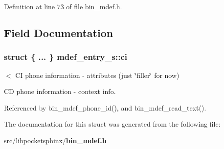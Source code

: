 Definition at line 73 of file bin\-\_\-mdef.\-h.



\subsection{Field Documentation}
\subsubsection[{ci}]{\setlength{\rightskip}{0pt plus 5cm}struct \{ ... \}   mdef\-\_\-entry\-\_\-s\-::ci}\label{structmdef__entry__s_a24e5db7af5e705b310e82154055043ec}


$<$ C\-I phone information -\/ attributes (just \char`\"{}filler\char`\"{} for now) 

C\-D phone information -\/ context info. 

Referenced by bin\-\_\-mdef\-\_\-phone\-\_\-id(), and bin\-\_\-mdef\-\_\-read\-\_\-text().



The documentation for this struct was generated from the following file\-:\begin{DoxyCompactItemize}
\item 
src/libpocketsphinx/{\bf bin\-\_\-mdef.\-h}\end{DoxyCompactItemize}
